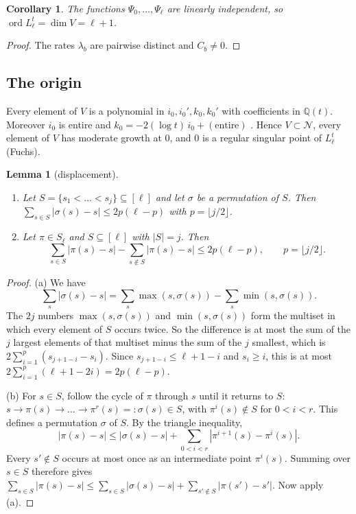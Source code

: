 \documentclass[11pt,a4paper]{article}
\newtheorem{lemma}[theorem]{Lemma}
\newtheorem{corollary}[theorem]{Corollary}
\theoremstyle{definition}
\theoremstyle{remark}
\newcommand{\Q}{\mathbb Q}
\newcommand{\fl}[1]{\lfloor #1\rfloor}
\DeclareMathOperator{\ord}{ord}
\numberwithin{equation}{section}
\begin{document}
\begin{corollary}\label{B:cor:dim}
The functions $\Psi_0,\dots,\Psi_\ell$ are linearly independent, so $\ord L^t_\ell=\dim V=\ell+1$.
\end{corollary}

\begin{proof}
The rates $\lambda_b$ are pairwise distinct and $C_b\ne0$.
\end{proof}

\subsection{The origin}\label{B:ssec:origin}
Every element of $V$ is a polynomial in $i_0,i_0',k_0,k_0'$ with coefficients in $\Q(t)$. Moreover $i_0$ is entire and $k_0=-2(\log t)\,i_0+(\text{entire})$ \cite[10.31.2]{DLMF}. Hence $V\subset\mathcal N$, every element of $V$ has moderate growth at $0$, and $0$ is a regular singular point of $L^t_\ell$ (Fuchs).

\begin{lemma}[displacement]\label{B:lem:disp}
\begin{enumerate}
\item[(a)] Let $S=\{s_1<\dots<s_j\}\subseteq[\ell]$ and let $\sigma$ be a permutation of $S$. Then $\sum_{s\in S}|\sigma(s)-s|\le2p(\ell-p)$ with $p=\fl{j/2}$.
\item[(b)] Let $\pi\in S_\ell$ and $S\subseteq[\ell]$ with $|S|=j$. Then
\[
\sum_{s\in S}|\pi(s)-s|-\sum_{s\notin S}|\pi(s)-s|\le 2p(\ell-p),\qquad p=\fl{j/2}.
\]
\end{enumerate}
\end{lemma}

\begin{proof}
(a) We have
\[
\sum_s|\sigma(s)-s|=\sum_s\max(s,\sigma(s))-\sum_s\min(s,\sigma(s)).
\]
The $2j$ numbers $\max(s,\sigma(s))$ and $\min(s,\sigma(s))$ form the multiset in which every element of $S$ occurs twice. So the difference is at most the sum of the $j$ largest elements of that multiset minus the sum of the $j$ smallest, which is $2\sum_{i=1}^{p}(s_{j+1-i}-s_i)$. Since $s_{j+1-i}\le\ell+1-i$ and $s_i\ge i$, this is at most $2\sum_{i=1}^p(\ell+1-2i)=2p(\ell-p)$.

(b) For $s\in S$, follow the cycle of $\pi$ through $s$ until it returns to $S$: $s\to\pi(s)\to\dots\to\pi^r(s)=:\sigma(s)\in S$, with $\pi^i(s)\notin S$ for $0<i<r$. This defines a permutation $\sigma$ of $S$. By the triangle inequality,
\[
|\pi(s)-s|\le|\sigma(s)-s|+\sum_{0<i<r}|\pi^{i+1}(s)-\pi^i(s)|.
\]
Every $s'\notin S$ occurs at most once as an intermediate point $\pi^i(s)$. Summing over $s\in S$ therefore gives $\sum_{s\in S}|\pi(s)-s|\le\sum_{s\in S}|\sigma(s)-s|+\sum_{s'\notin S}|\pi(s')-s'|$. Now apply (a).
\end{proof}
\end{document}
